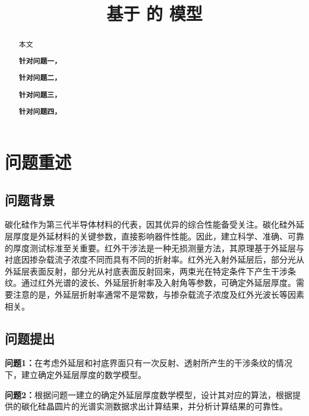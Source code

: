 \documentclass[withoutpreface,bwprint]{cumcmthesis} %
\title{基于 的 模型}
\begin{document}
\maketitle
\nocite{*}


\begin{abstract}
本文

    \textbf{针对问题一，}

    \textbf{针对问题二，}

    \textbf{针对问题三，}

    \textbf{针对问题四，}

\end{abstract}

\section{问题重述}

\subsection{问题背景}
碳化硅作为第三代半导体材料的代表，因其优异的综合性能备受关注。碳化硅外延层厚度是外延材料的关键参数，直接影响器件性能。因此，建立科学、准确、可靠的厚度测试标准至关重要。红外干涉法是一种无损测量方法，其原理基于外延层与衬底因掺杂载流子浓度不同而具有不同的折射率。红外光入射外延层后，部分光从外延层表面反射，部分光从衬底表面反射回来，两束光在特定条件下产生干涉条纹。通过红外光谱的波长、外延层折射率及入射角等参数，可确定外延层厚度。需要注意的是，外延层折射率通常不是常数，与掺杂载流子浓度及红外光波长等因素相关。

\subsection{问题提出}

\textbf{问题1：}在考虑外延层和衬底界面只有一次反射、透射所产生的干涉条纹的情况下，建立确定外延层厚度的数学模型。

\textbf{问题2：}根据问题一建立的确定外延层厚度数学模型，设计其对应的算法，根据提供的碳化硅晶圆片的光谱实测数据求出计算结果，并分析计算结果的可靠性。
\end{document}
